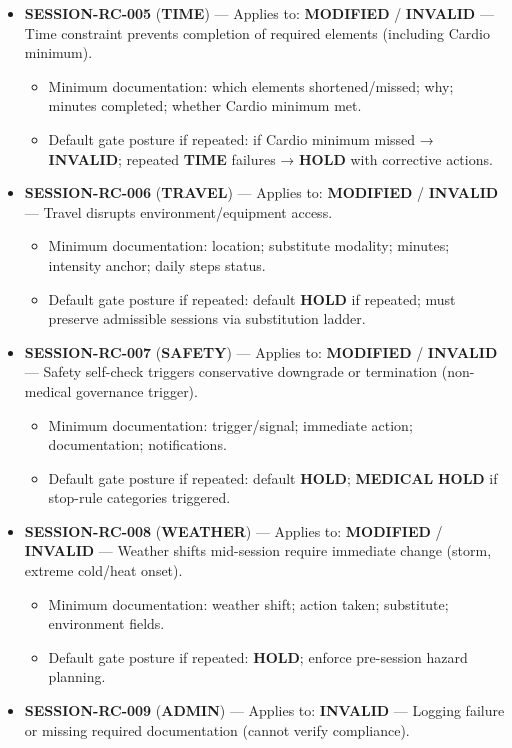 \documentclass[10pt]{article}
\begin{document}
\begin{itemize}
\item \textbf{SESSION-RC-005} (\textbf{TIME}) — Applies to: \textbf{MODIFIED} / \textbf{INVALID} — Time constraint prevents completion of required elements (including Cardio minimum).
\begin{itemize}
\item Minimum documentation: which elements shortened/missed; why; minutes completed; whether Cardio minimum met.
\item Default gate posture if repeated: if Cardio minimum missed → \textbf{INVALID}; repeated \textbf{TIME} failures → \textbf{HOLD} with corrective actions.
\end{itemize}
\item \textbf{SESSION-RC-006} (\textbf{TRAVEL}) — Applies to: \textbf{MODIFIED} / \textbf{INVALID} — Travel disrupts environment/equipment access.
\begin{itemize}
\item Minimum documentation: location; substitute modality; minutes; intensity anchor; daily steps status.
\item Default gate posture if repeated: default \textbf{HOLD} if repeated; must preserve admissible sessions via substitution ladder.
\end{itemize}
\item \textbf{SESSION-RC-007} (\textbf{SAFETY}) — Applies to: \textbf{MODIFIED} / \textbf{INVALID} — Safety self-check triggers conservative downgrade or termination (non-medical governance trigger).
\begin{itemize}
\item Minimum documentation: trigger/signal; immediate action; documentation; notifications.
\item Default gate posture if repeated: default \textbf{HOLD}; \textbf{MEDICAL} \textbf{HOLD} if stop-rule categories triggered.
\end{itemize}
\item \textbf{SESSION-RC-008} (\textbf{WEATHER}) — Applies to: \textbf{MODIFIED} / \textbf{INVALID} — Weather shifts mid-session require immediate change (storm, extreme cold/heat onset).
\begin{itemize}
\item Minimum documentation: weather shift; action taken; substitute; environment fields.
\item Default gate posture if repeated: \textbf{HOLD}; enforce pre-session hazard planning.
\end{itemize}
\item \textbf{SESSION-RC-009} (\textbf{ADMIN}) — Applies to: \textbf{INVALID} — Logging failure or missing required documentation (cannot verify compliance).

\end{itemize}
\end{document}
